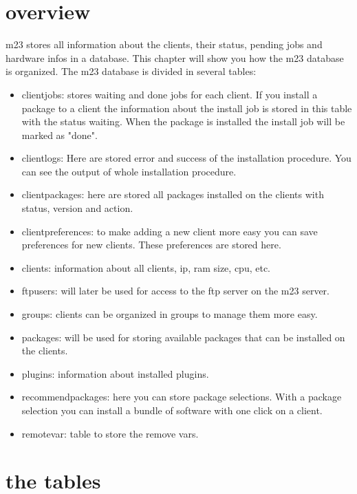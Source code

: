 \section{overview}
m23 stores all information about the clients, their status, pending jobs and hardware infos in a database. This chapter will show you how the m23 database is organized. The m23 database is divided in several tables:
\begin{itemize}
\item clientjobs: stores waiting and done jobs for each client. If you install a package to a client the information about the install job is stored in this table with the status waiting. When the package is installed the install job will be marked as "done".
\item clientlogs: Here are stored error and success of the installation procedure. You can see the output of whole installation procedure.
\item clientpackages: here are stored all packages installed on the clients with status, version and action.
\item clientpreferences: to make adding a new client more easy you can save preferences for new clients. These preferences are stored here.
\item clients: information about all clients, ip, ram size, cpu, etc.
\item ftpusers: will later be used for access to the ftp server on the m23 server.
\item groups: clients can be organized in groups to manage them more easy.
\item packages: will be used for storing available packages that can be installed on the clients.
\item plugins: information about installed plugins.
\item recommendpackages: here you can store package selections. With a package selection you can install a bundle of software with one click on a client.
\item remotevar: table to store the remove vars.
\end{itemize} 

\section{the tables}
